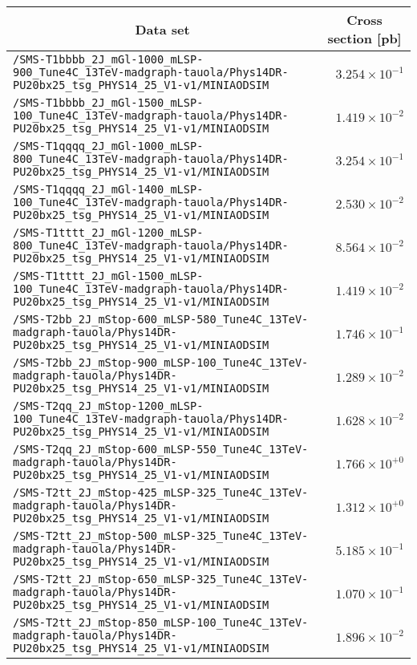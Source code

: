 \begin{center}
\begin{tabular}{lr}
\hline\hline
\multicolumn{1}{c}{Data set}&\multicolumn{1}{c}{Cross section [pb]}\tabularnewline
\hline
\verb!/SMS-T1bbbb_2J_mGl-1000_mLSP-900_Tune4C_13TeV-madgraph-tauola/Phys14DR-PU20bx25_tsg_PHYS14_25_V1-v1/MINIAODSIM! &$3.254\times 10^{-1}$\tabularnewline
\verb!/SMS-T1bbbb_2J_mGl-1500_mLSP-100_Tune4C_13TeV-madgraph-tauola/Phys14DR-PU20bx25_tsg_PHYS14_25_V1-v1/MINIAODSIM! &$1.419\times 10^{-2}$\tabularnewline
\verb!/SMS-T1qqqq_2J_mGl-1000_mLSP-800_Tune4C_13TeV-madgraph-tauola/Phys14DR-PU20bx25_tsg_PHYS14_25_V1-v1/MINIAODSIM! &$3.254\times 10^{-1}$\tabularnewline
\verb!/SMS-T1qqqq_2J_mGl-1400_mLSP-100_Tune4C_13TeV-madgraph-tauola/Phys14DR-PU20bx25_tsg_PHYS14_25_V1-v1/MINIAODSIM! &$2.530\times 10^{-2}$\tabularnewline
\verb!/SMS-T1tttt_2J_mGl-1200_mLSP-800_Tune4C_13TeV-madgraph-tauola/Phys14DR-PU20bx25_tsg_PHYS14_25_V1-v1/MINIAODSIM! &$8.564\times 10^{-2}$\tabularnewline
\verb!/SMS-T1tttt_2J_mGl-1500_mLSP-100_Tune4C_13TeV-madgraph-tauola/Phys14DR-PU20bx25_tsg_PHYS14_25_V1-v1/MINIAODSIM! &$1.419\times 10^{-2}$\tabularnewline
\verb!/SMS-T2bb_2J_mStop-600_mLSP-580_Tune4C_13TeV-madgraph-tauola/Phys14DR-PU20bx25_tsg_PHYS14_25_V1-v1/MINIAODSIM! &$1.746\times 10^{-1}$\tabularnewline
\verb!/SMS-T2bb_2J_mStop-900_mLSP-100_Tune4C_13TeV-madgraph-tauola/Phys14DR-PU20bx25_tsg_PHYS14_25_V1-v1/MINIAODSIM! &$1.289\times 10^{-2}$\tabularnewline
\verb!/SMS-T2qq_2J_mStop-1200_mLSP-100_Tune4C_13TeV-madgraph-tauola/Phys14DR-PU20bx25_tsg_PHYS14_25_V1-v1/MINIAODSIM! &$1.628\times 10^{-2}$\tabularnewline
\verb!/SMS-T2qq_2J_mStop-600_mLSP-550_Tune4C_13TeV-madgraph-tauola/Phys14DR-PU20bx25_tsg_PHYS14_25_V1-v1/MINIAODSIM! &$1.766\times 10^{+0}$\tabularnewline
\verb!/SMS-T2tt_2J_mStop-425_mLSP-325_Tune4C_13TeV-madgraph-tauola/Phys14DR-PU20bx25_tsg_PHYS14_25_V1-v1/MINIAODSIM! &$1.312\times 10^{+0}$\tabularnewline
\verb!/SMS-T2tt_2J_mStop-500_mLSP-325_Tune4C_13TeV-madgraph-tauola/Phys14DR-PU20bx25_tsg_PHYS14_25_V1-v1/MINIAODSIM! &$5.185\times 10^{-1}$\tabularnewline
\verb!/SMS-T2tt_2J_mStop-650_mLSP-325_Tune4C_13TeV-madgraph-tauola/Phys14DR-PU20bx25_tsg_PHYS14_25_V1-v1/MINIAODSIM! &$1.070\times 10^{-1}$\tabularnewline
\verb!/SMS-T2tt_2J_mStop-850_mLSP-100_Tune4C_13TeV-madgraph-tauola/Phys14DR-PU20bx25_tsg_PHYS14_25_V1-v1/MINIAODSIM! &$1.896\times 10^{-2}$\tabularnewline
\hline
\end{tabular}\end{center}
